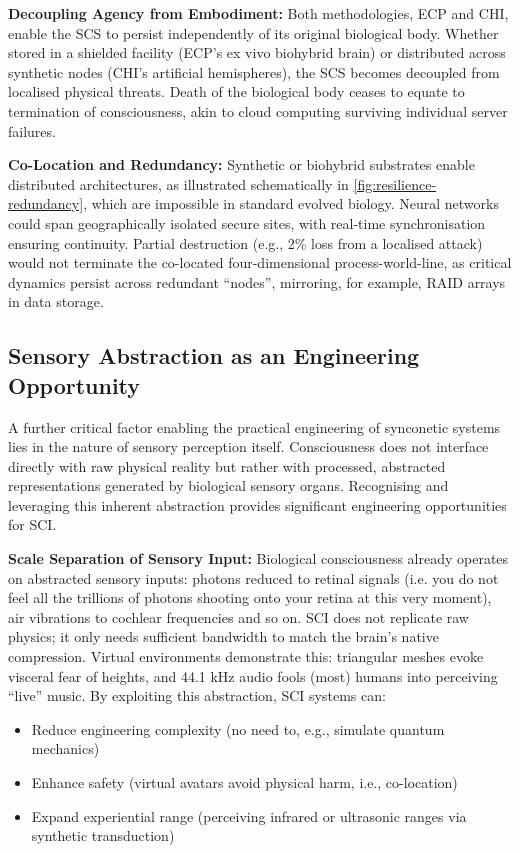 \documentclass[10pt]{article}
\begin{document}
\begin{sloppypar}
  \textbf{Decoupling Agency from Embodiment:} Both methodologies, ECP and CHI, enable the SCS to persist independently of its original biological body. Whether stored in a shielded facility (ECP’s ex vivo biohybrid brain) or distributed across synthetic nodes (CHI’s artificial hemispheres), the SCS becomes decoupled from localised physical threats. Death of the biological body ceases to equate to termination of consciousness, akin to cloud computing surviving individual server failures.

  \textbf{Co-Location and Redundancy:} Synthetic or biohybrid substrates enable distributed architectures, as illustrated schematically in \autoref{fig:resilience-redundancy}, which are impossible in standard evolved biology. Neural networks could span geographically isolated secure sites, with real-time synchronisation ensuring continuity. Partial destruction (e.g., 2\% loss from a localised attack) would not terminate the co-located four-dimensional process-world-line, as critical dynamics persist across redundant “nodes”, mirroring, for example, RAID arrays in data storage.

  \subsection{Sensory Abstraction as an Engineering Opportunity}
  \label{sec:sensory-abstraction}

  A further critical factor enabling the practical engineering of synconetic systems lies in the nature of sensory perception itself. Consciousness does not interface directly with raw physical reality but rather with processed, abstracted representations generated by biological sensory organs. Recognising and leveraging this inherent abstraction provides significant engineering opportunities for SCI.

  \textbf{Scale Separation of Sensory Input:} Biological consciousness already operates on abstracted sensory inputs: photons reduced to retinal signals (i.e. you do not feel all the trillions of photons shooting onto your retina at this very moment), air vibrations to cochlear frequencies and so on. SCI does not replicate raw physics; it only needs sufficient bandwidth to match the brain’s native compression. Virtual environments demonstrate this: triangular meshes evoke visceral fear of heights, and 44.1 kHz audio fools (most) humans into perceiving “live” music. By exploiting this abstraction, SCI systems can:

  \begin{itemize}
    \item Reduce engineering complexity (no need to, e.g., simulate quantum mechanics)
    \item Enhance safety (virtual avatars avoid physical harm, i.e., co-location)
    \item Expand experiential range (perceiving infrared or ultrasonic ranges via synthetic transduction)
  \end{itemize}


\end{sloppypar}
\end{document}
